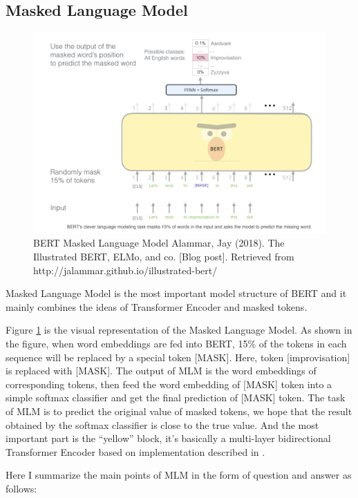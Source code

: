\documentclass[]{krantz}
\begin{document}
\hypertarget{masked-language-model}{%
\subsection{Masked Language Model}\label{masked-language-model}}

\begin{figure}

{\centering \includegraphics[width=0.7\linewidth]{figures/02-03-transfer-learning-for-nlp/bert_masked_task} 

}

\caption{BERT Masked Language Model  
 Alammar, Jay (2018). The Illustrated BERT, ELMo, and co. [Blog post]. Retrieved from http://jalammar.github.io/illustrated-bert/}\label{fig:ch02-03-figure03}
\end{figure}

Masked Language Model is the most important model structure of BERT and it mainly combines the ideas of Transformer Encoder and masked tokens.

Figure \ref{fig:ch02-03-figure03} is the visual representation of the Masked Language Model.
As shown in the figure, when word embeddings are fed into BERT, 15\% of the tokens in each sequence will be replaced by a special token {[}MASK{]}. Here, token {[}improvisation{]} is replaced with {[}MASK{]}. The output of MLM is the word embeddings of corresponding tokens, then feed the word embedding of {[}MASK{]} token into a simple softmax classifier and get the final prediction of {[}MASK{]} token. The task of MLM is to predict the original value of masked tokens, we hope that the result obtained by the softmax classifier is close to the true value. And the most important part is the ``yellow'' block, it's basically a multi-layer bidirectional Transformer Encoder based on implementation described in \citet{kaiser2017one}.

Here I summarize the main points of MLM in the form of question and answer as follows:
\end{document}
